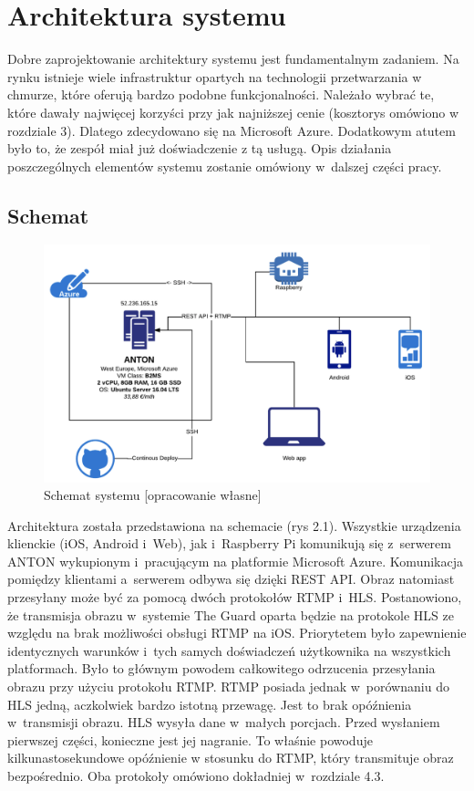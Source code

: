\documentclass[polish,bachelor,a4paper,oneside]{ppfcmthesis}
\begin{document}
    \chapter{Architektura systemu}

    Dobre zaprojektowanie architektury systemu jest fundamentalnym zadaniem. Na rynku istnieje wiele infrastruktur opartych na technologii przetwarzania w chmurze, które oferują bardzo podobne funkcjonalności. Należało wybrać te, które dawały najwięcej korzyści przy jak najniższej cenie (kosztorys omówiono w rozdziale 3). Dlatego zdecydowano się na Microsoft Azure. Dodatkowym atutem było to, że zespół miał już doświadczenie z tą usługą. Opis działania poszczególnych elementów systemu zostanie omówiony w~dalszej części pracy.

    \section{Schemat}

    \begin{figure}[ht]
        \centering
        \includegraphics[width=12cm]{anton.png}
        \caption{Schemat systemu [opracowanie własne]}
    \end{figure}

    Architektura została przedstawiona na schemacie (rys 2.1). Wszystkie urządzenia klienckie (iOS, Android i~Web), jak i~Raspberry Pi komunikują się z~serwerem ANTON wykupionym i~pracującym na platformie Microsoft Azure. Komunikacja pomiędzy klientami a~serwerem odbywa się dzięki REST API. Obraz natomiast przesyłany może być za pomocą dwóch protokołów RTMP i~HLS. Postanowiono, że transmisja obrazu w~systemie The Guard oparta będzie na protokole HLS ze względu na brak możliwości obsługi RTMP na iOS. Priorytetem było zapewnienie identycznych warunków i~tych samych doświadczeń użytkownika na wszystkich platformach. Było to głównym powodem całkowitego odrzucenia przesyłania obrazu przy użyciu protokołu RTMP. RTMP posiada jednak w~porównaniu do HLS jedną, aczkolwiek bardzo istotną przewagę. Jest to brak opóźnienia w~transmisji obrazu. HLS wysyła dane w~małych porcjach. Przed wysłaniem pierwszej części, konieczne jest jej nagranie. To właśnie powoduje kilkunastosekundowe opóźnienie w stosunku do RTMP, który transmituje obraz bezpośrednio. Oba protokoły omówiono dokładniej w~rozdziale 4.3.
\end{document}
